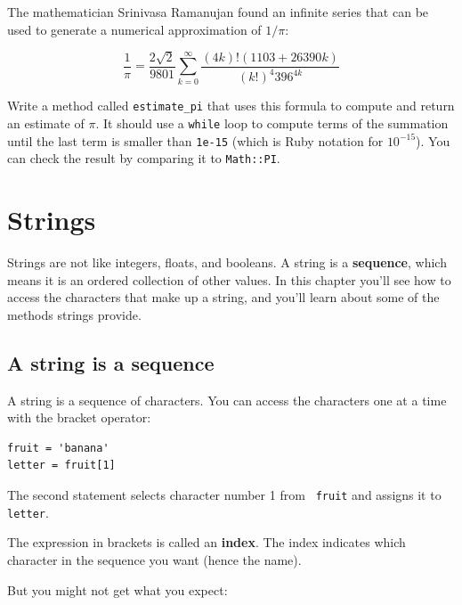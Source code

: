 \documentclass[10pt]{book}
\begin{document}
\begin{exercise}

The mathematician Srinivasa Ramanujan found an
infinite series
that can be used to generate a numerical
approximation of $1 / \pi$:

\[ \frac{1}{\pi} = \frac{2\sqrt{2}}{9801} 
\sum^\infty_{k=0} \frac{(4k)!(1103+26390k)}{(k!)^4 396^{4k}} \]

Write a method called \verb"estimate_pi" that uses this formula
to compute and return an estimate of $\pi$.  It should use a {\tt while}
loop to compute terms of the summation until the last term is
smaller than {\tt 1e-15} (which is Ruby notation for $10^{-15}$).
You can check the result by comparing it to {\tt Math::PI}.


\end{exercise}


\chapter{Strings}
\label{strings}

Strings are not like integers, floats, and booleans.  A string
is a {\bf sequence}, which means it is
an ordered collection of other values.  In this chapter you'll see
how to access the characters that make up a string, and you'll
learn about some of the methods strings provide.


\section{A string is a sequence}

A string is a sequence of characters.  
You can access the characters one at a time with the
bracket operator:

\begin{verbatim}
fruit = 'banana'
letter = fruit[1]
\end{verbatim}
%
The second statement selects character number 1 from {\tt
fruit} and assigns it to {\tt letter}.  

The expression in brackets is called an {\bf index}.  
The index indicates which character in the sequence you
want (hence the name).

But you might not get what you expect:
\end{document}
